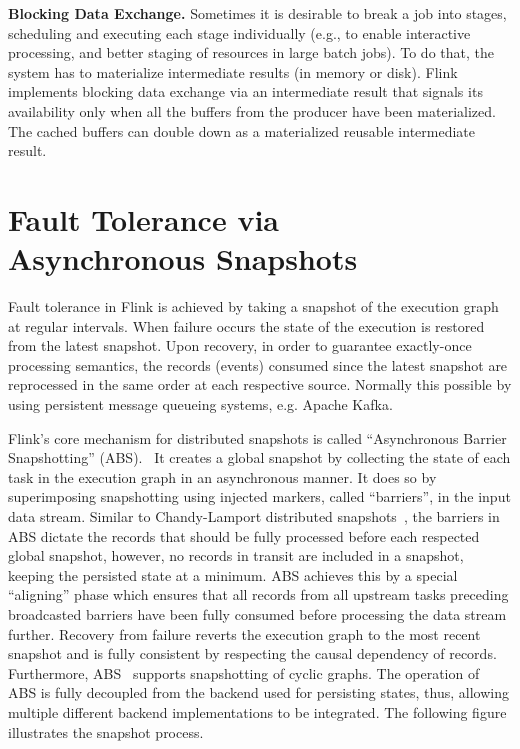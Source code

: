 \documentclass[11pt]{article}
\begin{document}
\textbf{Blocking Data Exchange.} Sometimes it is desirable to break a job into stages, scheduling and executing each stage individually (e.g., to enable interactive processing, and better staging of resources in large batch jobs). To do that, the system has to materialize intermediate results (in memory or disk). Flink implements blocking data exchange via an intermediate result that signals its availability only when all the buffers from the producer have been materialized. The cached buffers can double down as a materialized reusable intermediate result. 


\section{Fault Tolerance via \\ Asynchronous Snapshots}

Fault tolerance in Flink is achieved by taking a snapshot of the execution graph at regular intervals. When failure occurs the state of the execution is restored from the latest snapshot. Upon recovery, in order to guarantee exactly-once processing semantics, the records (events) consumed since the latest snapshot are reprocessed in the same order at each respective source. Normally this possible by using persistent message queueing systems, e.g. Apache Kafka.~\cite{CUSTOM:web/Kafka}

Flink's core mechanism for distributed snapshots is called ``Asynchronous Barrier Snapshotting'' (ABS).~\cite{carbone2015lightweight} It creates a global snapshot by collecting the state of each task in the execution graph in an asynchronous manner. It does so by superimposing snapshotting using injected markers, called ``barriers'', in the input data stream. Similar to Chandy-Lamport distributed snapshots~\cite{chandy1985distributed}, the barriers in ABS dictate the records that should be fully processed before each respected global snapshot, however, no records in transit are included in a snapshot, keeping the persisted state at a minimum. ABS achieves this by a special ``aligning'' phase which ensures that all records from all upstream tasks preceding broadcasted barriers have been fully consumed before processing the data stream further. Recovery from failure reverts the execution graph to the most recent snapshot and is fully consistent by respecting the causal dependency of records. Furthermore, ABS~\cite{carbone2015lightweight} supports snapshotting of cyclic graphs.  The operation of ABS is fully decoupled from the backend used for persisting states, thus, allowing multiple different backend implementations to be integrated. The following figure illustrates the snapshot process.
\end{document}
